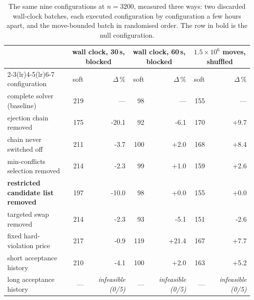 \begin{table}[t]
\centering
\caption{The same nine configurations at $n=3200$, measured three ways: two discarded wall-clock batches, each executed configuration by configuration a few hours apart, and the move-bounded batch in randomised order. The row in bold is the null configuration.}
\label{tab:threeviews}
\small
\begin{tabular}{@{}lrrrrrr@{}}
\toprule
& \multicolumn{2}{c}{wall clock, 30\,s, blocked} & \multicolumn{2}{c}{wall clock, 60\,s, blocked} & \multicolumn{2}{c}{$1.5\times10^6$ moves, shuffled} \\
\cmidrule(lr){2-3}\cmidrule(lr){4-5}\cmidrule(lr){6-7}
configuration & soft & $\Delta\,\%$ & soft & $\Delta\,\%$ & soft & $\Delta\,\%$ \\
\midrule
complete solver (baseline) & 219 & --- & 98 & --- & 155 & --- \\
ejection chain removed & 175 & -20.1 & 92 & -6.1 & 170 & +9.7 \\
chain never switched off & 211 & -3.7 & 100 & +2.0 & 168 & +8.4 \\
min-conflicts selection removed & 214 & -2.3 & 99 & +1.0 & 159 & +2.6 \\
\textbf{restricted candidate list removed} & 197 & -10.0 & 98 & +0.0 & 155 & +0.0 \\
targeted swap removed & 214 & -2.3 & 93 & -5.1 & 151 & -2.6 \\
fixed hard-violation price & 217 & -0.9 & 119 & +21.4 & 167 & +7.7 \\
short acceptance history & 210 & -4.1 & 100 & +2.0 & 163 & +5.2 \\
long acceptance history & --- & \emph{infeasible (0/5)} & --- & \emph{infeasible (0/5)} & --- & \emph{infeasible (0/5)} \\
\bottomrule
\end{tabular}
\end{table}
